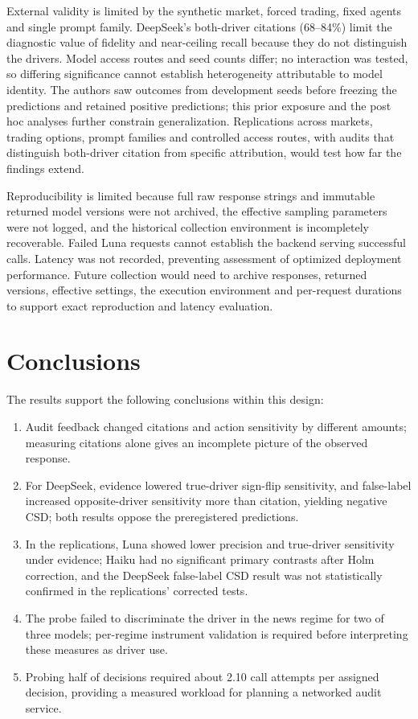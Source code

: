 \documentclass[futureinternet,article,submit,moreauthors,pdftex]{Definitions/mdpi}
\begin{document}
External validity is limited by the synthetic market, forced trading, fixed agents and single prompt family. DeepSeek's both-driver citations (68--84\%) limit the diagnostic value of fidelity and near-ceiling recall because they do not distinguish the drivers. Model access routes and seed counts differ; no interaction was tested, so differing significance cannot establish heterogeneity attributable to model identity. The authors saw outcomes from development seeds before freezing the predictions and retained positive predictions; this prior exposure and the post hoc analyses further constrain generalization. Replications across markets, trading options, prompt families and controlled access routes, with audits that distinguish both-driver citation from specific attribution, would test how far the findings extend.

Reproducibility is limited because full raw response strings and immutable returned model versions were not archived, the effective sampling parameters were not logged, and the historical collection environment is incompletely recoverable. Failed Luna requests cannot establish the backend serving successful calls. Latency was not recorded, preventing assessment of optimized deployment performance. Future collection would need to archive responses, returned versions, effective settings, the execution environment and per-request durations to support exact reproduction and latency evaluation.

\section{Conclusions}\label{sec:conclusions}
The results support the following conclusions within this design:
\begin{enumerate}\setlength{\itemsep}{0pt}
\item Audit feedback changed citations and action sensitivity by different amounts; measuring citations alone gives an incomplete picture of the observed response.
\item For DeepSeek, evidence lowered true-driver sign-flip sensitivity, and false-label increased opposite-driver sensitivity more than citation, yielding negative CSD; both results oppose the preregistered predictions.
\item In the replications, Luna showed lower precision and true-driver sensitivity under evidence; Haiku had no significant primary contrasts after Holm correction, and the DeepSeek false-label CSD result was not statistically confirmed in the replications' corrected tests.
\item The probe failed to discriminate the driver in the news regime for two of three models; per-regime instrument validation is required before interpreting these measures as driver use.
\item Probing half of decisions required about 2.10 call attempts per assigned decision, providing a measured workload for planning a networked audit service.
\end{enumerate}
\end{document}
